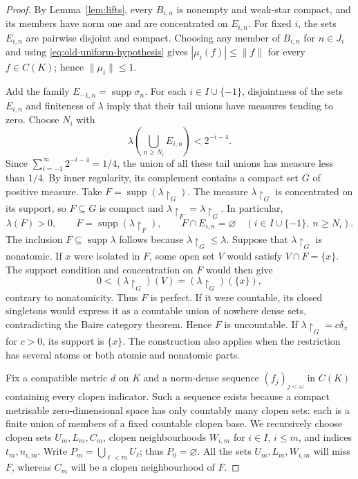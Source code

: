 \documentclass[a4paper,11pt]{amsart}
\theoremstyle{plain}
\theoremstyle{definition}
\theoremstyle{remark}
\newcommand{\supp}{\operatorname{supp}}
\newcommand{\restr}[1]{{\restriction_{#1}}}
\numberwithin{equation}{section}
\begin{document}
\begin{proof}
By Lemma~\ref{lem:lifts}, every $B_{i,n}$ is nonempty and weak-star
compact, and its members have norm one and are concentrated on
$E_{i,n}$. For fixed $i$, the sets $E_{i,n}$ are pairwise disjoint and compact. Choosing any member of $B_{i,n}$ for $n\in J_i$ and using
\eqref{eq:old-uniform-hypothesis} gives
$|\mu_i(f)|\leqslant\|f\|$ for every $f\in C(K)$; hence
$\|\mu_i\|\leqslant1$.

Add the family $E_{-1,n}=\supp\sigma_n$. For each
$i\in I\cup\{-1\}$, disjointness of the sets $E_{i,n}$ and finiteness
of $\lambda$ imply that their tail unions have measures tending to zero.
Choose $N_i$ with
\[
 \lambda\left(\bigcup_{n\geqslant N_i}E_{i,n}\right)<2^{-i-4}.
\]
Since $\sum_{i=-1}^{\infty}2^{-i-4}=1/4$, the union of all these tail
unions has measure less than $1/4$. By inner regularity, its complement
contains a compact set $G$ of positive measure. Take
$F=\supp(\lambda\restr{G})$. The measure $\lambda\restr{G}$ is
concentrated on its support, so $F\subseteq G$ is compact and
$\lambda\restr{F}=\lambda\restr{G}$. In particular,
\begin{equation}\label{eq:F-properties}
 \lambda(F)>0,\qquad F=\supp(\lambda\restr{F}),\qquad
 F\cap E_{i,n}=\varnothing
 \quad(i\in I\cup\{-1\},\ n\geqslant N_i).
\end{equation}
The inclusion $F\subseteq\supp\lambda$ follows because
$\lambda\restr{G}\leqslant\lambda$. Suppose that $\lambda\restr{G}$
is nonatomic. If $x$ were isolated in $F$, some open set $V$ would satisfy
$V\cap F=\{x\}$. The support condition and concentration on $F$ would
then give
\[
 0<(\lambda\restr{G})(V)=(\lambda\restr{G})(\{x\}),
\]
contrary to nonatomicity. Thus $F$ is perfect. If it were countable,
its closed singletons would express it as a countable union of nowhere
dense sets, contradicting the Baire category theorem. Hence $F$ is
uncountable. If $\lambda\restr{G}=c\delta_x$ for $c>0$, its support
is $\{x\}$. The construction also applies when the restriction has
several atoms or both atomic and nonatomic parts.

Fix a compatible metric $d$ on $K$ and a norm-dense sequence
$(f_j)_{j<\omega}$ in $C(K)$ containing every clopen indicator.
Such a sequence exists because a compact metrisable zero-dimensional
space has only countably many clopen sets: each is a finite union of
members of a fixed countable clopen base.
We recursively choose clopen sets $U_m,L_m,C_m$, clopen neighbourhoods
$W_{i,m}$ for $i\in I$, $i\leqslant m$, and indices $t_m,n_{i,m}$.
Write $P_m=\bigcup_{\ell<m}U_\ell$; thus $P_0=\varnothing$.
All the sets $U_m,L_m,W_{i,m}$ will miss $F$, whereas $C_m$ will be a
clopen neighbourhood of $F$.


\end{proof}
\end{document}
